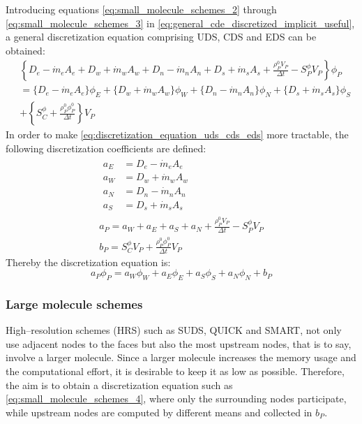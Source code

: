 \noindent
Introducing equations \eqref{eq:small_molecule_schemes_2} through
\eqref{eq:small_molecule_schemes_3} in
\eqref{eq:general_cde_discretized_implicit_useful}, a general discretization
equation comprising UDS, CDS and EDS can be obtained:
\begin{align} 
	&\left\{
	D_e - \dot{m}_e A_e +
	D_w + \dot{m}_w A_w +
	D_n - \dot{m}_n A_n +
	D_s + \dot{m}_s A_s + 
	\frac{\rho_P^0 V_P}{\Delta t} - S_P^\phi V_P
	\right\} \phi_P \nonumber \\
	&= 
	\Big\{ D_e - \dot{m}_e A_e \Big\} \phi_E + 
	\Big\{ D_w + \dot{m}_w A_w \Big\} \phi_W + 
	\Big\{ D_n - \dot{m}_n A_n \Big\} \phi_N + 
	\Big\{ D_s + \dot{m}_s A_s \Big\} \phi_S \nonumber \\
	&+ \left\{ S_C^\phi + \frac{\rho_P^0 \phi_P^0}{\Delta t} \right\} V_P \label{eq:discretization_equation_uds_cds_eds}
\end{align}
In order to make \eqref{eq:discretization_equation_uds_cds_eds} more tractable,
the following discretization coefficients are defined:
\begin{gather}
	\begin{align}
		a_E &= D_e - \dot{m}_e A_e \\
		a_W &= D_w + \dot{m}_w A_w \\
		a_N &= D_n - \dot{m}_n A_n \\
		a_S &= D_s + \dot{m}_s A_s
	\end{align} \\
	a_P = a_W + a_E + a_S + a_N + \frac{\rho_P^0 V_P}{\Delta t} - S_P^\phi V_P \\
	b_P = S_C^\phi V_P + \frac{\rho_P^0 \phi_P^0}{\Delta t} V_P
\end{gather}
Thereby the discretization equation is:
\begin{equation} \label{eq:small_molecule_schemes_4}
	a_P \phi_P = a_W \phi_W + a_E \phi_E + a_S \phi_S + a_N \phi_N + b_P
\end{equation}

\subsubsection{Large molecule schemes}

High--resolution schemes (HRS) such as SUDS, QUICK and SMART, not only use
adjacent nodes to the faces but also the most upstream nodes, that is to say,
involve a larger molecule. Since a larger molecule increases the memory usage
and the computational effort, it is desirable to keep it as low as possible.
Therefore, the aim is to obtain a discretization equation such as
\eqref{eq:small_molecule_schemes_4}, where only the surrounding nodes
participate, while upstream nodes are computed by different means and collected
in $b_P$. 

